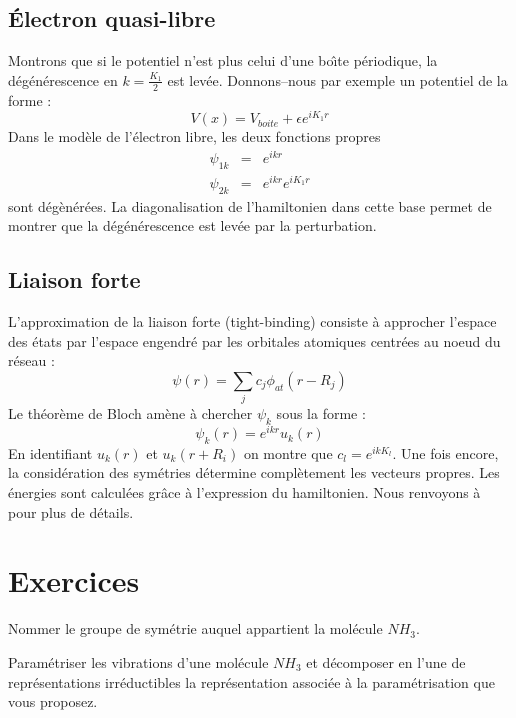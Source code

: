 \documentclass[12pt]{book}
\begin{document}
\subsection{\'Electron quasi-libre}
Montrons que si le potentiel n'est plus celui d'une bo\^\i te p\'eriodique,
la d\'eg\'en\'erescence en $k=\frac{K_1}{2}$ est lev\'ee.
Donnons--nous par exemple un potentiel de la forme :
\begin{equation}
V(x)=V_{boite}+\epsilon e^{iK_1r}
\end{equation}
Dans le mod\`ele de l'\'electron libre, les deux fonctions propres 
\begin{eqnarray}
\psi_{1k}&=&e^{ikr}\\
\psi_{2k}&=&e^{ikr}e^{iK_1r}
\end{eqnarray}
sont d\'eg\`en\'er\'ees. La diagonalisation de l'hamiltonien dans
cette base permet de montrer que la d\'eg\'en\'erescence est lev\'ee
par la perturbation.
\subsection{Liaison forte}
L'approximation de la liaison forte
(tight-binding)\cite{ph:solid:Ashcroft76}  consiste \`a
approcher l'espace des \'etats par l'espace engendr\'e par les
orbitales atomiques centr\'ees au noeud du r\'eseau :
\begin{equation}
\psi(r)=\sum_j c_j\phi_{at}(r-R_j)
\end{equation}
Le th\'eor\`eme de Bloch am\`ene \`a chercher $\psi_k$ sous la forme :
\begin{equation}
\psi_k(r)=e^{ikr}u_k(r)
\end{equation}
En identifiant $u_k(r)$ et $u_k(r+R_i)$ on montre que $c_l=e^{ikK_l}$.
Une fois encore, la consid\'eration des sym\'etries d\'etermine
compl\`etement les vecteurs propres. Les \'energies sont calcul\'ees
gr\^ace \`a l'expression du hamiltonien. Nous renvoyons \`a
\cite{ph:solid:Ashcroft76} pour plus de d\'etails. 


\section{Exercices}

\begin{exo}
Nommer le groupe de sym\'etrie auquel appartient la mol\'ecule $NH_{3}$.
\end{exo}
\begin{exo}
Param\'etriser les vibrations d'une mol\'ecule $NH_{3}$ et d\'ecomposer en
l'une 
de repr\'esentations irr\'eductibles la repr\'esentation associ\'ee \`a la
param\'etrisation que vous proposez. 
\end{exo}
\end{document}
